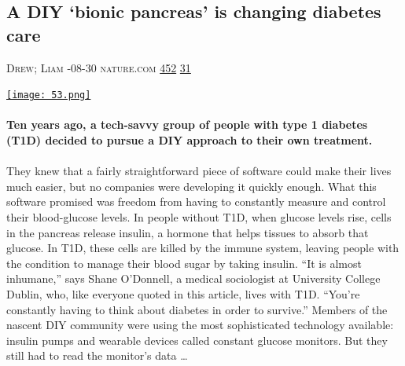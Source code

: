 \documentclass[10pt,a4paper]{article}
\begin{document}
\begin{multicols}{2}
\raggedcolumns
\noindent\begin{minipage}{\linewidth}
\medskip
\subsection{A DIY ‘bionic pancreas’ is changing diabetes care}
\textsc{\footnotesize
{\scriptsize\faUser}\space 
Drew; Liam 
{\scriptsize\faCalendar}-08-30 
{\scriptsize\faGlobe}\space 
nature.com 
{\scriptsize\faThumbsOUp}\space 
\href{http://news.ycombinator.com/item?id=37321028\&utm\_term=comment}{452} 
{\scriptsize\faComments}\space 
\href{http://news.ycombinator.com/item?id=37321028\&utm\_term=comment}{31} 
}
\par\medskip\noindent
\href{https://www.nature.com/articles/d41586-023-02648-9?utm\_source=hackernewsletter\&utm\_medium=email\&utm\_term=learn}{
    \texttt{[image: 53.png]}
}
\end{minipage}
\paragraph{}
\textbf{Ten years ago, a tech-savvy group of people with type 1 diabetes (T1D) decided to pursue a DIY approach to their own treatment.}
\paragraph{}
 They knew that a fairly straightforward piece of software could make their lives much easier, but no companies were developing it quickly enough.
What this software promised was freedom from having to constantly measure and control their blood-glucose levels. In people without T1D, when glucose levels rise, cells in the pancreas release insulin, a hormone that helps tissues to absorb that glucose. In T1D, these cells are killed by the immune system, leaving people with the condition to manage their blood sugar by taking insulin.
“It is almost inhumane,” says Shane O’Donnell, a medical sociologist at University College Dublin, who, like everyone quoted in this article, lives with T1D. “You’re constantly having to think about diabetes in order to survive.”
Members of the nascent DIY community were using the most sophisticated technology available: insulin pumps and wearable devices called constant glucose monitors. But they still had to read the monitor’s data
\dots\par
\noindent\begin{minipage}{\linewidth}
\medskip

\end{minipage}
\end{multicols}
\end{document}
